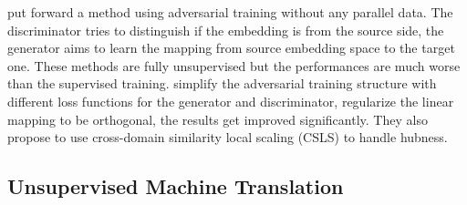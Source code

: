 \cite{zhang2017adversarial} put forward  a method using adversarial training without any parallel data. The discriminator tries to distinguish if the embedding is from the source side, the generator aims to learn the mapping from source embedding space to the target one. These methods are fully unsupervised but the performances are much worse than the supervised training. \cite{conneau2017word} simplify the adversarial training structure with different loss functions for the generator and discriminator, regularize the linear mapping to be orthogonal, the results get improved significantly. They also propose to use cross-domain similarity local scaling (CSLS) to handle hubness.

\subsection{Unsupervised Machine Translation}

